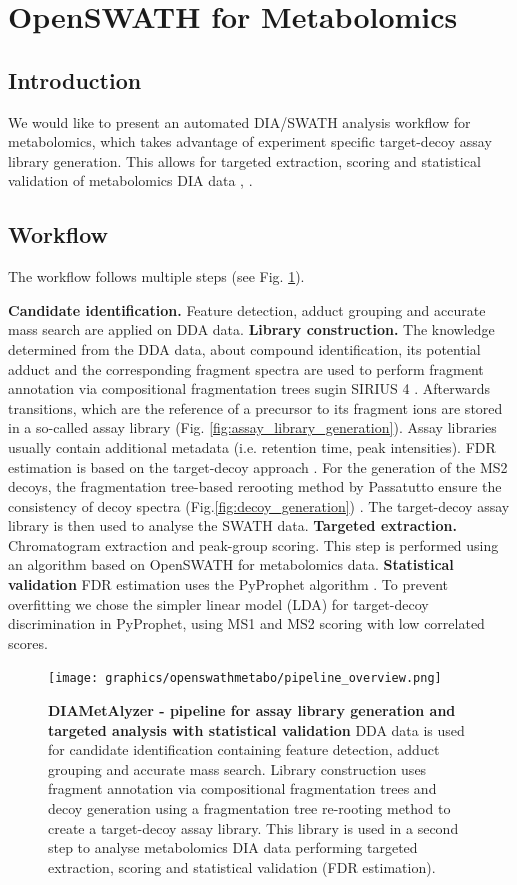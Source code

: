 \section{OpenSWATH for Metabolomics}
\subsection{Introduction}
We would like to present an automated DIA/SWATH analysis workflow for metabolomics, which takes advantage of experiment specific target-decoy assay library generation. This allows for targeted extraction, scoring and statistical validation of metabolomics DIA data \cite{Rost2014}, \cite{Teleman2015}. 

\subsection{Workflow}
The workflow follows multiple steps (see Fig. \ref{fig:pipline_overview}). 

\textbf{Candidate identification.} Feature detection, adduct grouping and accurate mass search are applied on DDA data. \textbf{Library construction.} The knowledge determined from the DDA data, about  compound identification, its potential adduct and the corresponding fragment spectra are used to perform fragment annotation via compositional fragmentation trees sugin SIRIUS 4 \cite{Duhrkop2019}. Afterwards transitions, which are the reference of a precursor to its fragment ions are stored in a so-called assay library (Fig. \ref{fig:assay_library_generation}). Assay libraries usually contain additional metadata (i.e. retention time, peak intensities). FDR estimation is based on the target-decoy approach \cite{Elias2007}. For the generation of the MS2 decoys, the fragmentation tree-based rerooting method by Passatutto ensure the consistency of decoy spectra (Fig.\ref{fig:decoy_generation}) \cite{Scheubert2017}. The target-decoy assay library is then used to analyse the SWATH data. \textbf{Targeted extraction.} Chromatogram extraction and peak-group scoring. This step is performed using an algorithm based on OpenSWATH \cite{Rost2014} for metabolomics data. \textbf{Statistical validation} FDR estimation uses the PyProphet algorithm \cite{Teleman2015}. To prevent overfitting we chose the simpler linear model (LDA) for target-decoy discrimination in PyProphet, using MS1 and MS2 scoring with low correlated scores.

\begin{figure}[!t]
  \centering
  \texttt{[image: graphics/openswathmetabo/pipeline\_overview.png]}
  \caption{\textbf{DIAMetAlyzer - pipeline for assay library generation and targeted analysis with statistical validation} DDA data is used for candidate identification containing feature detection, adduct grouping and accurate mass search. Library construction uses fragment annotation via compositional fragmentation trees and decoy generation using a fragmentation tree re-rooting method to create a target-decoy assay library. This library is used in a second step to analyse metabolomics DIA data performing targeted extraction, scoring and statistical validation (FDR estimation).}
  \label{fig:pipline_overview}
\end{figure}

